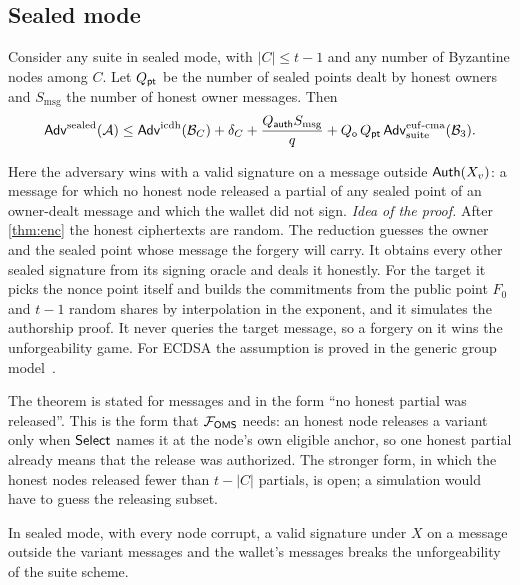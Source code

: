 \subsection{Sealed mode}

\begin{theorem}\label{thm:sealed}
Consider any suite in sealed mode, with $|C| \le t-1$ and any number of Byzantine nodes among $C$. Let $Q_{\mathsf{pt}}$ be the number of sealed points dealt by honest owners and $S_{\mathrm{msg}}$ the number of honest owner messages. Then
\[
  \mathsf{Adv}^{\mathrm{sealed}}(\mathcal{A}) \le \mathsf{Adv}^{\mathrm{icdh}}(\mathcal{B}_C) + \delta_C + \frac{Q_{\mathsf{auth}} S_{\mathrm{msg}}}{q} + Q_{\mathsf{o}}\,Q_{\mathsf{pt}}\,\mathsf{Adv}^{\mathrm{euf\text{-}cma}}_{\mathrm{suite}}(\mathcal{B}_3).
\]
\end{theorem}

Here the adversary wins with a valid signature on a message outside $\mathsf{Auth}(X_v)$: a message for which no honest node released a partial of any sealed point of an owner-dealt message and which the wallet did not sign. \emph{Idea of the proof.} After \cref{thm:enc} the honest ciphertexts are random. The reduction guesses the owner and the sealed point whose message the forgery will carry. It obtains every other sealed signature from its signing oracle and deals it honestly. For the target it picks the nonce point itself and builds the commitments from the public point $F_0$ and $t-1$ random shares by interpolation in the exponent, and it simulates the authorship proof. It never queries the target message, so a forgery on it wins the unforgeability game. For ECDSA the assumption is proved in the generic group model~\cite[Theorem~1]{GS21}.

The theorem is stated for messages and in the form ``no honest partial was released''. This is the form that $\mathcal{F}_{\mathsf{OMS}}$ needs: an honest node releases a variant only when $\mathsf{Select}$ names it at the node's own eligible anchor, so one honest partial already means that the release was authorized. The stronger form, in which the honest nodes released fewer than $t - |C|$ partials, is open; a simulation would have to guess the releasing subset.

\begin{corollary}\label{cor:corrupt}
In sealed mode, with every node corrupt, a valid signature under $X$ on a message outside the variant messages and the wallet's messages breaks the unforgeability of the suite scheme.
\end{corollary}

